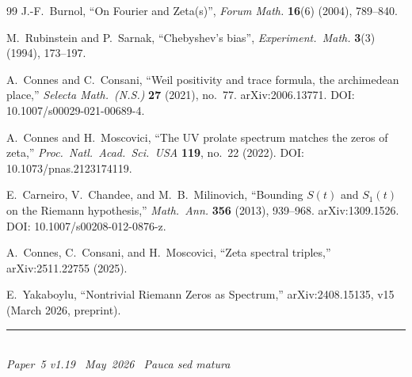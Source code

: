 \documentclass[11pt]{article}
\begin{document}
\begin{thebibliography}{99}
J.-F.~Burnol,
``On Fourier and Zeta(s)'',
\emph{Forum Math.} \textbf{16}(6) (2004), 789--840.

M.~Rubinstein and P.~Sarnak,
``Chebyshev's bias'',
\emph{Experiment.\ Math.} \textbf{3}(3) (1994), 173--197.

A.~Connes and C.~Consani,
``Weil positivity and trace formula, the archimedean place,''
\textit{Selecta Math.\ (N.S.)} \textbf{27} (2021), no.~77.
arXiv:2006.13771.
DOI: 10.1007/s00029-021-00689-4.

A.~Connes and H.~Moscovici,
``The UV prolate spectrum matches the zeros of zeta,''
\textit{Proc.\ Natl.\ Acad.\ Sci.\ USA}
\textbf{119}, no.~22 (2022).
DOI: 10.1073/pnas.2123174119.

E.~Carneiro, V.~Chandee, and M.~B.~Milinovich,
``Bounding $S(t)$ and $S_1(t)$ on the Riemann hypothesis,''
\textit{Math.\ Ann.} \textbf{356} (2013), 939--968.
arXiv:1309.1526.
DOI: 10.1007/s00208-012-0876-z.

A.~Connes, C.~Consani, and H.~Moscovici,
``Zeta spectral triples,''
arXiv:2511.22755 (2025).

E.~Yakaboylu,
``Nontrivial Riemann Zeros as Spectrum,''
arXiv:2408.15135, v15 (March 2026, preprint).

\end{thebibliography}

\enlargethispage{3\baselineskip}
\vspace*{\fill}
\begin{minipage}{\linewidth}
\rule{\linewidth}{0.4pt}\smallskip\\
\small\emph{Paper~5 v1.19 \textperiodcentered\ May~2026
\textperiodcentered\ Pauca sed matura}
\end{minipage}
\end{document}
